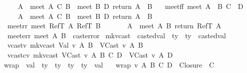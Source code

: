 \begin{isabellebody}
\ \ \ \ \ {\isacharparenleft}A{\isacharprime}\ {\isacharcolon}{\isacharequal}\ meet\ A\ C{\isacharsemicolon}\ B{\isacharprime}\ {\isacharcolon}{\isacharequal}\ meet\ B\ D{\isacharsemicolon}\ return\ {\isacharparenleft}A{\isacharprime}\ {\isasymtimes}\ B{\isacharprime}{\isacharparenright}{\isacharparenright}{\isachardoublequoteclose}\ {\isacharbar}\isanewline
\ \ meetff{\isacharcolon}\ {\isachardoublequoteopen}meet\ {\isacharparenleft}A\ {\isasymrightarrow}\ B{\isacharparenright}\ {\isacharparenleft}C\ {\isasymrightarrow}\ D{\isacharparenright}\ {\isacharequal}\ \isanewline
\ \ \ \ \ {\isacharparenleft}A{\isacharprime}\ {\isacharcolon}{\isacharequal}\ meet\ A\ C{\isacharsemicolon}\ B{\isacharprime}\ {\isacharcolon}{\isacharequal}\ meet\ B\ D{\isacharsemicolon}\ return\ {\isacharparenleft}A{\isacharprime}\ {\isasymrightarrow}\ B{\isacharprime}{\isacharparenright}{\isacharparenright}{\isachardoublequoteclose}\ {\isacharbar}\isanewline
\ \ meetrr{\isacharcolon}\ {\isachardoublequoteopen}meet\ {\isacharparenleft}RefT\ A{\isacharparenright}\ {\isacharparenleft}RefT\ B{\isacharparenright}\ {\isacharequal}\ \isanewline
\ \ \ \ \ {\isacharparenleft}A{\isacharprime}\ {\isacharcolon}{\isacharequal}\ meet\ A\ B{\isacharsemicolon}\ return\ {\isacharparenleft}RefT\ A{\isacharprime}{\isacharparenright}{\isacharparenright}{\isachardoublequoteclose}\ {\isacharbar}\isanewline
\ \ meeterr{\isacharcolon}\ {\isachardoublequoteopen}meet\ A\ B\ {\isacharequal}\ cast{\isacharunderscore}error{\isachardoublequoteclose}\isanewline
\isanewline
{}\isamarkupfalse \ mk{\isacharunderscore}vcast\ {\isacharcolon}{\isacharcolon}\ {\isachardoublequoteopen}casted{\isacharunderscore}val\ {\isasymRightarrow}\ ty\ {\isasymRightarrow}\ ty\ {\isasymRightarrow}\ casted{\isacharunderscore}val{\isachardoublequoteclose}\ \isanewline
\ \ vcastv{\isacharcolon}\ {\isachardoublequoteopen}mk{\isacharunderscore}vcast\ {\isacharparenleft}Val\ v{\isacharparenright}\ A\ B\ {\isacharequal}\ VCast\ v\ A\ B{\isachardoublequoteclose}\ {\isacharbar}\isanewline
\ \ vcastcv{\isacharcolon}\ {\isachardoublequoteopen}mk{\isacharunderscore}vcast\ {\isacharparenleft}VCast\ v\ A\ B{\isacharparenright}\ C\ D\ {\isacharequal}\ VCast\ v\ A\ D{\isachardoublequoteclose}\isanewline
\isanewline
{}\isamarkupfalse \ wrap\ {\isacharcolon}{\isacharcolon}\ {\isachardoublequoteopen}val\ {\isasymRightarrow}\ ty\ {\isasymRightarrow}\ ty\ {\isasymRightarrow}\ ty\ {\isasymRightarrow}\ ty\ {\isasymRightarrow}\ val{\isachardoublequoteclose}\ \isanewline
\ \ {\isachardoublequoteopen}wrap\ v\ A\ B\ C\ D\ {\isasymequiv}\ {\isacharparenleft}Closure\ {}\ C\isanewline

\end{isabellebody}
